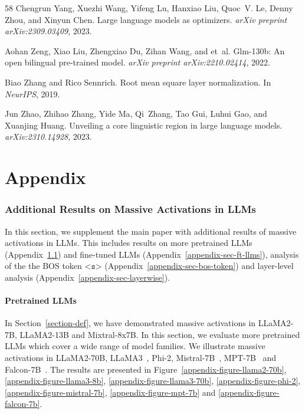 \documentclass[10pt]{article}
\theoremstyle{definition}
\theoremstyle{plain}
\begin{document}
\begin{thebibliography}{58}
Chengrun Yang, Xuezhi Wang, Yifeng Lu, Hanxiao Liu, Quoc~V. Le, Denny Zhou, and Xinyun Chen.
\newblock Large language models as optimizers.
\newblock \emph{arXiv preprint arXiv:2309.03409}, 2023.

Aohan Zeng, Xiao Liu, Zhengxiao Du, Zihan Wang, and et~al.
\newblock Glm-130b: An open bilingual pre-trained model.
\newblock \emph{arXiv preprint arXiv:2210.02414}, 2022.

Biao Zhang and Rico Sennrich.
\newblock Root mean square layer normalization.
\newblock In \emph{NeurIPS}, 2019.

Jun Zhao, Zhihao Zhang, Yide Ma, Qi~Zhang, Tao Gui, Luhui Gao, and Xuanjing Huang.
\newblock Unveiling a core linguistic region in large language models.
\newblock \emph{arXiv:2310.14928}, 2023.

\end{thebibliography}
 


\newpage
\appendix

\part{Appendix} 


\section{Additional Results on Massive Activations in LLMs}\label{sec-appendix-existence-massive-activations}
In this section, we supplement the main paper with additional results of massive activations in LLMs. This includes results on more pretrained LLMs (Appendix~\ref{appendix-sec-more-llms}) and fine-tuned LLMs (Appendix~\ref{appendix-sec-ft-llms}), analysis of the the BOS token $\texttt{<s>}$ (Appendix~\ref{appendix-sec-bos-token}) and layer-level analysis (Appendix~\ref{appendix-sec-layerwise}).

\subsection{Pretrained LLMs}\label{appendix-sec-more-llms}
In Section~\ref{section-def}, we have demonstrated massive activations in LLaMA2-7B, LLaMA2-13B and Mixtral-8x7B. In this section, we evaluate more pretrained LLMs which cover a wide range of model families. We illustrate massive activations in LLaMA2-70B, LLaMA3~\citep{Dubey2024llama3}, Phi-2, Mistral-7B~\citep{mistral}, MPT-7B~\citep{MosaicML2023Introducing} and Falcon-7B~\citep{falcon}. The results are presented in Figure~\ref{appendix-figure-llama2-70b}, \ref{appendix-figure-llama3-8b}, \ref{appendix-figure-llama3-70b}, \ref{appendix-figure-phi-2}, \ref{appendix-figure-mistral-7b}, \ref{appendix-figure-mpt-7b}  and \ref{appendix-figure-falcon-7b}. 
\end{document}
